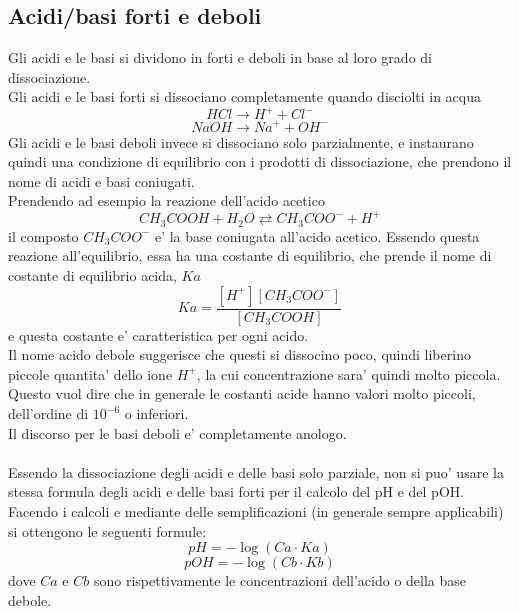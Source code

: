 \documentclass[12pt]{article}
\begin{document}
\subsection{Acidi/basi forti e deboli}
Gli acidi e le basi si dividono in forti e deboli in base al loro grado di dissociazione. \\
Gli acidi e le basi forti si dissociano completamente quando disciolti in acqua
$$
	HCl \rightarrow H^+ + Cl^-
$$
$$
	NaOH \rightarrow Na^+ + OH^-
$$
Gli acidi e le basi deboli invece si dissociano solo parzialmente, e instaurano quindi una condizione di equilibrio con i prodotti di dissociazione, che prendono il nome di acidi e basi coniugati. \\
Prendendo ad esempio la reazione dell'acido acetico
$$
	CH_3COOH + H_2O \rightleftarrows CH_3COO^- + H^+
$$
il composto $CH_3COO^-$ e' la base coniugata all'acido acetico. Essendo questa reazione all'equilibrio, essa ha una costante di equilibrio, che prende il nome di costante di equilibrio acida, $Ka$
$$
	Ka = \frac{[H^+][CH_3COO^-]}{[CH_3COOH]}
$$
e questa costante e' caratteristica per ogni acido. \\
Il nome acido debole suggerisce che questi si dissocino poco, quindi liberino piccole quantita' dello ione $H^+$, la cui concentrazione sara' quindi molto piccola. Questo vuol dire che in generale le costanti acide hanno valori molto piccoli, dell'ordine di $10^{-6}$ o inferiori. \\ 
Il discorso per le basi deboli e' completamente anologo. \\ \\ 
Essendo la dissociazione degli acidi e delle basi solo parziale, non si puo' usare la stessa formula degli acidi e delle basi forti per il calcolo del pH e del pOH. Facendo i calcoli e mediante delle semplificazioni (in generale sempre applicabili) si ottengono le seguenti formule:
$$
	pH = -\log(Ca\cdot Ka)
$$
$$
	pOH = -\log(Cb\cdot Kb)
$$
dove $Ca$ e $Cb$ sono rispettivamente le concentrazioni dell'acido o della base debole.
\end{document}
